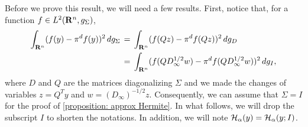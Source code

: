 Before we prove this result, we will need a few results. First, notice that,
for a function $f \in L^2(\mathbf R^n, g_{\Sigma})$,
\begin{align}
    \int_{\mathbf R^n} (f(y)-\pi^d f(y))^2 \,dg_{\Sigma} &\,=\,
    \int_{\mathbf R^n} (f(Qz) - \pi^df(Qz))^2 \, dg_{D}  \\ &\,=\,
    \int_{\mathbf R^n} (f(QD_\infty^{1/2}w) - \pi^df(QD_\infty^{1/2}w))^2 \, dg_{I},
\end{align}
where $D$ and $Q$ are the matrices diagonalizing $\Sigma$ and we made the
changes of variables $z = Q^T y$ and $w = (D_\infty)^{-1/2}z$. Consequently, we
can assume that $\Sigma = I$ for the proof of \ref{proposition: approx
Hermite}. In what follows, we will drop the subscript $I$ to shorten the notations. 
In addition, we will note $\mathcal H_\alpha(y) = \mathcal H_\alpha(y; I)$. 

